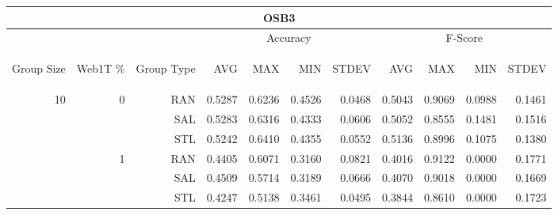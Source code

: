 \begin{center}
\begin{table}[htbp]
\begin{tabular}{ | r | r | r | r | r | r | r | r | r | r | r |}
\hline
\multicolumn{11}{|c|}{OSB3}\\
\hline
 & & & \multicolumn{4}{|c|}{Accuracy} & \multicolumn{4}{|c|}{F-Score}\\ \cline{4-11}
\begin{sideways}Group Size\end{sideways} & \begin{sideways}Web1T \%\end{sideways} & \begin{sideways}Group Type\end{sideways} & \begin{sideways}AVG\end{sideways} & \begin{sideways}MAX\end{sideways} & \begin{sideways}MIN\end{sideways} & \begin{sideways}STDEV\end{sideways} & \begin{sideways}AVG\end{sideways} & \begin{sideways}MAX\end{sideways} & \begin{sideways}MIN\end{sideways} & \begin{sideways}STDEV\end{sideways}\\
\hline
\multirow{18}{*}{10}
 & \multirow{3}{*}{0} & RAN & 0.5287 & 0.6236 & 0.4526 & 0.0468 & 0.5043 & 0.9069 & 0.0988 & 0.1461\\ \cline{3-11}
 &   & SAL & 0.5283 & 0.6316 & 0.4333 & 0.0606 & 0.5052 & 0.8555 & 0.1481 & 0.1516\\ \cline{3-11}
 &   & STL & 0.5242 & 0.6410 & 0.4355 & 0.0552 & 0.5136 & 0.8996 & 0.1075 & 0.1380\\ \cline{2-11}
 & \multirow{3}{*}{1} & RAN & 0.4405 & 0.6071 & 0.3160 & 0.0821 & 0.4016 & 0.9122 & 0.0000 & 0.1771\\ \cline{3-11}
 &   & SAL & 0.4509 & 0.5714 & 0.3189 & 0.0666 & 0.4070 & 0.9018 & 0.0000 & 0.1669\\ \cline{3-11}
 &   & STL & 0.4247 & 0.5138 & 0.3461 & 0.0495 & 0.3844 & 0.8610 & 0.0000 & 0.1723\\ \cline{2-11}

\end{tabular}
\end{table}
\end{center}
